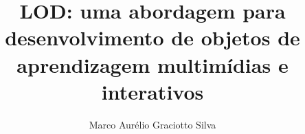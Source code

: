 \documentclass[english,brazil,utf8,12pt]{icmc-dissertation}
\title{LOD: uma abordagem para desenvolvimento de objetos de
aprendizagem multimídias e interativos}
\author{Marco Aurélio Graciotto Silva}
\begin{document}
\frontmatter
\maketitle

\tableofcontents
\listoffigures
\listoftables
\lstlistoflistings{}
\listofacronyms{}



\mainmatter





\end{document}
